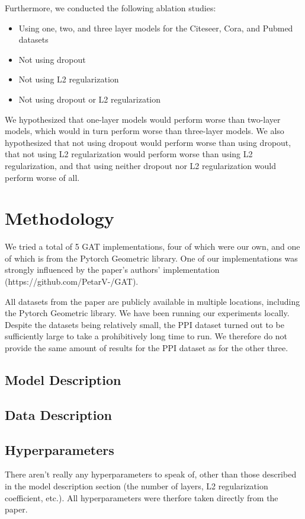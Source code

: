 \documentclass{article}
\begin{document}
    Furthermore, we conducted the following ablation studies:
    \begin{itemize}
        \item Using one, two, and three layer models for the Citeseer, Cora, and Pubmed datasets
	\item Not using dropout
	\item Not using L2 regularization
	\item Not using dropout or L2 regularization
    \end{itemize}
    We hypothesized that one-layer models would perform worse than two-layer models, which would in turn perform worse than three-layer models. We also hypothesized that not using dropout would perform worse than using dropout, that not using L2 regularization would perform worse than using L2 regularization, and that using neither dropout nor L2 regularization would perform worse of all.

    \section{Methodology}\label{sec:methodology}
    We tried a total of 5 GAT implementations, four of which were our own, and
    one of which is from the Pytorch Geometric library. One of our
    implementations was strongly influenced by the paper's authors'
    implementation (https://github.com/PetarV-/GAT).

    All datasets from the paper are publicly available in multiple locations,
    including the Pytorch Geometric library. We have been running our
    experiments locally. Despite the datasets being relatively small, the PPI
    dataset turned out to be sufficiently large to take a prohibitively long
    time to run. We therefore do not provide the same amount of results for the
    PPI dataset as for the other three.

    \subsection{Model Description}\label{subsec:model-description}
    

    \subsection{Data Description}\label{subsec:data-description}
    

    \subsection{Hyperparameters}\label{subsec:hyperparameters}
    There aren't really any hyperparameters to speak of, other than those
    described in the model description section (the number of layers, L2
    regularization coefficient, etc.). All hyperparameters were therfore taken
    directly from the paper.
\end{document}
